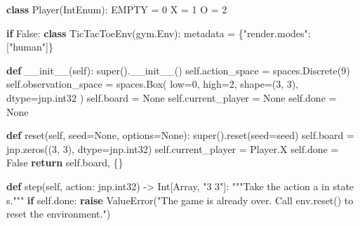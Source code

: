 \documentclass[
  letterpaper,
  DIV=11,
  numbers=noendperiod]{scrreprt}
\newenvironment{Shaded}{\begin{snugshade}}{\end{snugshade}}
\newcommand{\BuiltInTok}[1]{\textcolor[rgb]{0.00,0.23,0.31}{#1}}
\newcommand{\CommentTok}[1]{\textcolor[rgb]{0.37,0.37,0.37}{#1}}
\newcommand{\ControlFlowTok}[1]{\textcolor[rgb]{0.00,0.23,0.31}{\textbf{#1}}}
\newcommand{\DecValTok}[1]{\textcolor[rgb]{0.68,0.00,0.00}{#1}}
\newcommand{\FunctionTok}[1]{\textcolor[rgb]{0.28,0.35,0.67}{#1}}
\newcommand{\KeywordTok}[1]{\textcolor[rgb]{0.00,0.23,0.31}{\textbf{#1}}}
\newcommand{\NormalTok}[1]{\textcolor[rgb]{0.00,0.23,0.31}{#1}}
\newcommand{\OperatorTok}[1]{\textcolor[rgb]{0.37,0.37,0.37}{#1}}
\newcommand{\PreprocessorTok}[1]{\textcolor[rgb]{0.68,0.00,0.00}{#1}}
\newcommand{\StringTok}[1]{\textcolor[rgb]{0.13,0.47,0.30}{#1}}
\newcommand{\VariableTok}[1]{\textcolor[rgb]{0.07,0.07,0.07}{#1}}
\theoremstyle{plain}
\theoremstyle{plain}
\theoremstyle{definition}
\theoremstyle{definition}
\theoremstyle{remark}
\begin{document}
\begin{Shaded}
\begin{Highlighting}[]
\KeywordTok{class}\NormalTok{ Player(IntEnum):}
\NormalTok{    EMPTY }\OperatorTok{=} \DecValTok{0}
\NormalTok{    X }\OperatorTok{=} \DecValTok{1}
\NormalTok{    O }\OperatorTok{=} \DecValTok{2}


\ControlFlowTok{if} \VariableTok{False}\NormalTok{:}
    \KeywordTok{class}\NormalTok{ TicTacToeEnv(gym.Env):}
\NormalTok{        metadata }\OperatorTok{=}\NormalTok{ \{}\StringTok{"render.modes"}\NormalTok{: [}\StringTok{"human"}\NormalTok{]\}}

        \KeywordTok{def} \FunctionTok{\_\_init\_\_}\NormalTok{(}\VariableTok{self}\NormalTok{):}
            \BuiltInTok{super}\NormalTok{().}\FunctionTok{\_\_init\_\_}\NormalTok{()}
            \VariableTok{self}\NormalTok{.action\_space }\OperatorTok{=}\NormalTok{ spaces.Discrete(}\DecValTok{9}\NormalTok{)}
            \VariableTok{self}\NormalTok{.observation\_space }\OperatorTok{=}\NormalTok{ spaces.Box(}
\NormalTok{                low}\OperatorTok{=}\DecValTok{0}\NormalTok{, high}\OperatorTok{=}\DecValTok{2}\NormalTok{, shape}\OperatorTok{=}\NormalTok{(}\DecValTok{3}\NormalTok{, }\DecValTok{3}\NormalTok{), dtype}\OperatorTok{=}\NormalTok{jnp.int32}
\NormalTok{            )}
            \VariableTok{self}\NormalTok{.board }\OperatorTok{=} \VariableTok{None}
            \VariableTok{self}\NormalTok{.current\_player }\OperatorTok{=} \VariableTok{None}
            \VariableTok{self}\NormalTok{.done }\OperatorTok{=} \VariableTok{None}

        \KeywordTok{def}\NormalTok{ reset(}\VariableTok{self}\NormalTok{, seed}\OperatorTok{=}\VariableTok{None}\NormalTok{, options}\OperatorTok{=}\VariableTok{None}\NormalTok{):}
            \BuiltInTok{super}\NormalTok{().reset(seed}\OperatorTok{=}\NormalTok{seed)}
            \VariableTok{self}\NormalTok{.board }\OperatorTok{=}\NormalTok{ jnp.zeros((}\DecValTok{3}\NormalTok{, }\DecValTok{3}\NormalTok{), dtype}\OperatorTok{=}\NormalTok{jnp.int32)}
            \VariableTok{self}\NormalTok{.current\_player }\OperatorTok{=}\NormalTok{ Player.X}
            \VariableTok{self}\NormalTok{.done }\OperatorTok{=} \VariableTok{False}
            \ControlFlowTok{return} \VariableTok{self}\NormalTok{.board, \{\}}

        \KeywordTok{def}\NormalTok{ step(}\VariableTok{self}\NormalTok{, action: jnp.int32) }\OperatorTok{{-}\textgreater{}}\NormalTok{ Int[Array, }\StringTok{"3 3"}\NormalTok{]:}
            \CommentTok{"""Take the action a in state s."""}
            \ControlFlowTok{if} \VariableTok{self}\NormalTok{.done:}
                \ControlFlowTok{raise} \PreprocessorTok{ValueError}\NormalTok{(}\StringTok{"The game is already over. Call \textasciigrave{}env.reset()\textasciigrave{} to reset the environment."}\NormalTok{)}
            

\end{Highlighting}
\end{Shaded}
\end{document}
